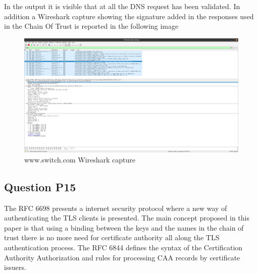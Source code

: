 \inputminted{text}{DNSSec_dig_short.txt}
\label{log:DNSSec_dig_1}

\inputminted{text}{DNSSec_dig_long.txt}
\label{log:DNSSec_dig_2}


In the output it is visible that at  all the DNS request has been validated.
In addition a Wireshark capture showing the signature added in the responses used in the Chain Of Trust is reported in the following image
\begin{figure}[H]
	\centering
	\includegraphics[width=\linewidth]{images/DNSSec_trust_chain.png}
	\caption{www.switch.com Wireshark capture}
	\label{fig:DNSSec_wireshark_capture}
\end{figure}



\subsection{Question P15}
The RFC 6698 presents a internet security protocol where a new way of authenticating the TLS clients is presented. The main concept proposed in this paper is that using a binding between the keys and the names in the chain of trust there is no more need for certificate authority all along the TLS authentication process. 
The RFC 6844 defines the syntax of the Certification Authority Authorization and rules for processing CAA records by certificate issuers.



